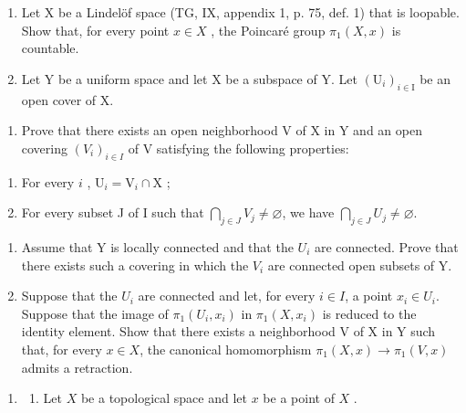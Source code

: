 \exercisegroup

\begin{enumerate}
\def\labelenumi{\arabic{enumi})}
\item
  Let X be a Lindelöf space (TG, IX, appendix 1, p. 75, def. 1) that is loopable. Show that, for every point \(x \in X\) , the Poincaré group \(\pi_1(X, x)\) is countable.
\item
  Let Y be a uniform space and let X be a subspace of Y. Let \((\mathrm{U}_{i})_{i\in\mathrm{I}}\) be an open cover of X.
\end{enumerate}

\begin{enumerate}
\def\labelenumi{\alph{enumi})}
\tightlist
\item
  Prove that there exists an open neighborhood V of X in Y and an open covering \((V_{i})_{i\in I}\) of V satisfying the following properties:
\end{enumerate}

\begin{enumerate}
\def\labelenumi{(\roman{enumi})}
\item
  For every \(i\) , \(\mathrm{U}_i = \mathrm{V}_i \cap \mathrm{X}\) ;
\item
  For every subset J of I such that \(\bigcap_{j\in J}V_j\neq \varnothing\), we have \(\bigcap_{j\in J}U_j\neq \varnothing .\)
\end{enumerate}

\begin{enumerate}
\def\labelenumi{\alph{enumi})}
\setcounter{enumi}{1}
\item
  Assume that Y is locally connected and that the \(U_{i}\) are connected. Prove that there exists such a covering in which the \(V_{i}\) are connected open subsets of Y.
\item
  Suppose that the \(U_{i}\) are connected and let, for every \(i \in I\), a point \(x_{i} \in U_{i}\). Suppose that the image of \(\pi_{1}(U_{i}, x_{i})\) in \(\pi_{1}(X, x_{i})\) is reduced to the identity element. Show that there exists a neighborhood V of X in Y such that, for every \(x \in X\), the canonical homomorphism \(\pi_{1}(X, x) \to \pi_{1}(V, x)\) admits a retraction.
\end{enumerate}

\begin{enumerate}
\def\labelenumi{\arabic{enumi})}
\setcounter{enumi}{2}
\tightlist
\item
  \begin{enumerate}
  \def\labelenumii{(\arabic{enumii})}
  \setcounter{enumii}{2}
  \tightlist
  \item
    Let \(X\) be a topological space and let \(x\) be a point of \(X\) .
  \end{enumerate}
\end{enumerate}

